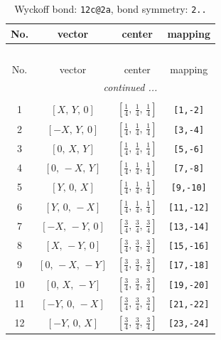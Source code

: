 \documentclass[fleqn,8pt]{jsarticle}
\begin{document}
\begin{longtable}{cccc}
\caption{Wyckoff bond: {\tt 12c@2a}, bond symmetry: {\tt 2..}}
 \\
 \hline \hline
No. & vector & center & mapping \\ \hline \endfirsthead

\multicolumn{3}{l}{\tablename\ \thetable{}} \\
 \hline \hline
No. & vector & center & mapping \\ \hline \endhead

 \hline \hline
\multicolumn{3}{r}{\footnotesize\it continued ...} \\ \endfoot

 \hline \hline
\multicolumn{3}{r}{} \\ \endlastfoot

1 & $\left[ X,\, Y,\, 0 \right]$ & $\left[ \frac{1}{4},\, \frac{1}{4},\, \frac{1}{4} \right]$ & {\tt [1,-2]} \\ \hline
2 & $\left[ - X,\, Y,\, 0 \right]$ & $\left[ \frac{1}{4},\, \frac{1}{4},\, \frac{1}{4} \right]$ & {\tt [3,-4]} \\ \hline
3 & $\left[ 0,\, X,\, Y \right]$ & $\left[ \frac{1}{4},\, \frac{1}{4},\, \frac{1}{4} \right]$ & {\tt [5,-6]} \\ \hline
4 & $\left[ 0,\, - X,\, Y \right]$ & $\left[ \frac{1}{4},\, \frac{1}{4},\, \frac{1}{4} \right]$ & {\tt [7,-8]} \\ \hline
5 & $\left[ Y,\, 0,\, X \right]$ & $\left[ \frac{1}{4},\, \frac{1}{4},\, \frac{1}{4} \right]$ & {\tt [9,-10]} \\ \hline
6 & $\left[ Y,\, 0,\, - X \right]$ & $\left[ \frac{1}{4},\, \frac{1}{4},\, \frac{1}{4} \right]$ & {\tt [11,-12]} \\ \hline
7 & $\left[ - X,\, - Y,\, 0 \right]$ & $\left[ \frac{3}{4},\, \frac{3}{4},\, \frac{3}{4} \right]$ & {\tt [13,-14]} \\ \hline
8 & $\left[ X,\, - Y,\, 0 \right]$ & $\left[ \frac{3}{4},\, \frac{3}{4},\, \frac{3}{4} \right]$ & {\tt [15,-16]} \\ \hline
9 & $\left[ 0,\, - X,\, - Y \right]$ & $\left[ \frac{3}{4},\, \frac{3}{4},\, \frac{3}{4} \right]$ & {\tt [17,-18]} \\ \hline
10 & $\left[ 0,\, X,\, - Y \right]$ & $\left[ \frac{3}{4},\, \frac{3}{4},\, \frac{3}{4} \right]$ & {\tt [19,-20]} \\ \hline
11 & $\left[ - Y,\, 0,\, - X \right]$ & $\left[ \frac{3}{4},\, \frac{3}{4},\, \frac{3}{4} \right]$ & {\tt [21,-22]} \\ \hline
12 & $\left[ - Y,\, 0,\, X \right]$ & $\left[ \frac{3}{4},\, \frac{3}{4},\, \frac{3}{4} \right]$ & {\tt [23,-24]} \\
\end{longtable}
\end{document}
